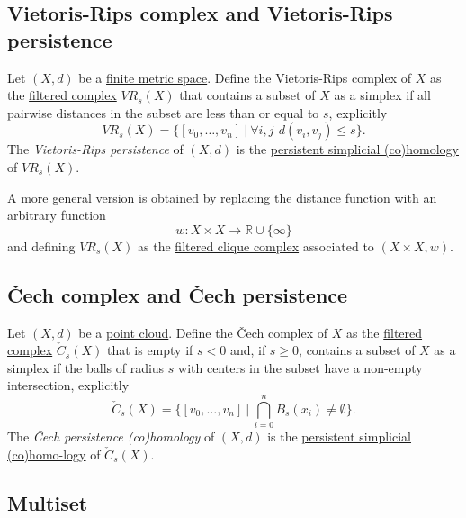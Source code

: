 \documentclass{amsart}
\begin{document}
	\subsection*{Vietoris-Rips complex and Vietoris-Rips persistence} \label{vietoris-rips complex and vietoris-rips persistence}
	
	Let $(X, d)$ be a \hyperref[finite metric spaces and point clouds]{finite metric space}. Define the Vietoris-Rips complex of $X$ as the \hyperref[filtered complex]{filtered complex} $VR_s(X)$ that contains a subset of $X$ as a simplex if all pairwise distances in the subset are less than or equal to $s$, explicitly
	\begin{equation*}
	VR_s(X) = \Big\{ [v_0,\dots,v_n]\ \Big|\ \forall i,j\ \,d(v_i, v_j) \leq s \Big\}.
	\end{equation*}
	The \textit{Vietoris-Rips persistence} of $(X, d)$ is the \hyperref[persistent simplicial (co)homology]{persistent simplicial (co)homology} of $VR_s(X)$.
	
	A more general version is obtained by replacing the distance function with an arbitrary function
	\begin{equation*}
	w : X \times X \to \mathbb R \cup \{\infty\}
	\end{equation*}
	and defining $VR_s(X)$ as the \hyperref[clique and flag complexes]{filtered clique complex} associated to $(X \times X ,w)$.
	
	
	\subsection*{\v{C}ech complex and \v{C}ech persistence} \label{cech complex and cech persistence}
	
	Let $(X, d)$ be a \hyperref[finite metric spaces and point clouds]{point cloud}. Define the \v{C}ech complex of $X$ as the \hyperref[filtered complex]{filtered complex} $\check{C}_s(X)$ that is empty if $s<0$ and, if $s \geq 0$, contains a subset of $X$ as a simplex if the balls of radius $s$ with centers in the subset have a non-empty intersection, explicitly
	\begin{equation*}
	\check{C}_s(X) = \Big\{ [v_0,\dots,v_n]\ \Big|\ \bigcap_{i=0}^n B_s(x_i) \neq \emptyset \Big\}.
	\end{equation*}
	The \textit{\v Cech persistence (co)homology} of $(X,d)$ is the \hyperref[persistent simplicial (co)homology]{persistent simplicial (co)homo-logy} of $\check{C}_s(X)$.
	
	\subsection*{Multiset} \label{multiset}
	
\end{document}
